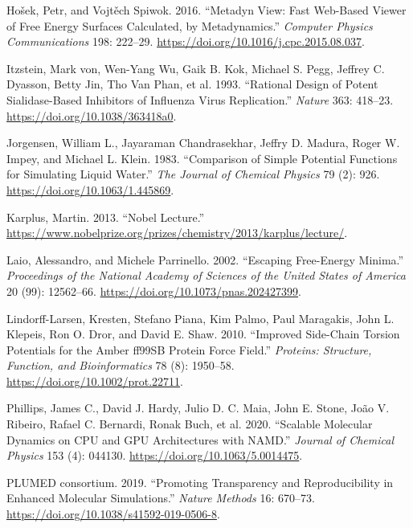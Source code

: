 \begin{CSLReferences}{1}{0}
\leavevmode{}%
Hošek, Petr, and Vojtěch Spiwok. 2016. {``Metadyn View: Fast Web-Based Viewer of Free Energy Surfaces Calculated, by Metadynamics.''} \emph{Computer Physics Communications} 198: 222--29. \url{https://doi.org/10.1016/j.cpc.2015.08.037}.

\leavevmode{}%
Itzstein, Mark von, Wen-Yang Wu, Gaik B. Kok, Michael S. Pegg, Jeffrey C. Dyasson, Betty Jin, Tho Van Phan, et al. 1993. {``Rational Design of Potent Sialidase-Based Inhibitors of Influenza Virus Replication.''} \emph{Nature} 363: 418--23. \url{https://doi.org/10.1038/363418a0}.

\leavevmode{}%
Jorgensen, William L., Jayaraman Chandrasekhar, Jeffry D. Madura, Roger W. Impey, and Michael L. Klein. 1983. {``Comparison of Simple Potential Functions for Simulating Liquid Water.''} \emph{The Journal of Chemical Physics} 79 (2): 926. \url{https://doi.org/10.1063/1.445869}.

\leavevmode{}%
Karplus, Martin. 2013. {``Nobel Lecture.''} \url{https://www.nobelprize.org/prizes/chemistry/2013/karplus/lecture/}.

\leavevmode{}%
Laio, Alessandro, and Michele Parrinello. 2002. {``Escaping Free-Energy Minima.''} \emph{Proceedings of the National Academy of Sciences of the United States of America} 20 (99): 12562--66. \url{https://doi.org/10.1073/pnas.202427399}.

\leavevmode{}%
Lindorff-Larsen, Kresten, Stefano Piana, Kim Palmo, Paul Maragakis, John L. Klepeis, Ron O. Dror, and David E. Shaw. 2010. {``Improved Side-Chain Torsion Potentials for the Amber ff99SB Protein Force Field.''} \emph{Proteins: Structure, Function, and Bioinformatics} 78 (8): 1950--58. \url{https://doi.org/10.1002/prot.22711}.

\leavevmode{}%
Phillips, James C., David J. Hardy, Julio D. C. Maia, John E. Stone, João V. Ribeiro, Rafael C. Bernardi, Ronak Buch, et al. 2020. {``Scalable Molecular Dynamics on CPU and GPU Architectures with NAMD.''} \emph{Journal of Chemical Physics} 153 (4): 044130. \url{https://doi.org/10.1063/5.0014475}.

\leavevmode{}%
PLUMED consortium. 2019. {``Promoting Transparency and Reproducibility in Enhanced Molecular Simulations.''} \emph{Nature Methods} 16: 670--73. \url{https://doi.org/10.1038/s41592-019-0506-8}.


\end{CSLReferences}

